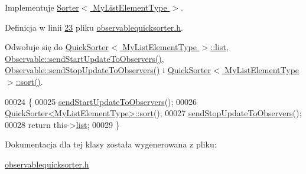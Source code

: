 Implementuje \hyperlink{class_sorter_a4a82d8151d6172802d1e60cb30c7d7d3}{Sorter$<$ My\-List\-Element\-Type $>$}.



Definicja w linii \hyperlink{observablequicksorter_8h_source_l00023}{23} pliku \hyperlink{observablequicksorter_8h_source}{observablequicksorter.\-h}.



Odwołuje się do \hyperlink{quicksorter_8h_source_l00023}{Quick\-Sorter$<$ My\-List\-Element\-Type $>$\-::list}, \hyperlink{observable_8h_source_l00023}{Observable\-::send\-Start\-Update\-To\-Observers()}, \hyperlink{observable_8h_source_l00030}{Observable\-::send\-Stop\-Update\-To\-Observers()} i \hyperlink{quicksorter_8h_source_l00061}{Quick\-Sorter$<$ My\-List\-Element\-Type $>$\-::sort()}.


\begin{DoxyCode}
00024         \{
00025                 \hyperlink{class_observable_a78df64057f152342a43f27979186a6ba}{sendStartUpdateToObservers}();
00026                 \hyperlink{class_quick_sorter_ae2b74900a972d05c06df3c9a06123c00}{QuickSorter<MyListElementType>::sort}();
00027                 \hyperlink{class_observable_a16f75ed1514a0cb7526b5a5d2b7ca7c6}{sendStopUpdateToObservers}();
00028                 \textcolor{keywordflow}{return} this->\hyperlink{class_quick_sorter_a60a7a4772c958f256962294418e83fe4}{list};
00029         \}
\end{DoxyCode}


Dokumentacja dla tej klasy została wygenerowana z pliku\-:\begin{DoxyCompactItemize}
\item 
\hyperlink{observablequicksorter_8h}{observablequicksorter.\-h}\end{DoxyCompactItemize}
